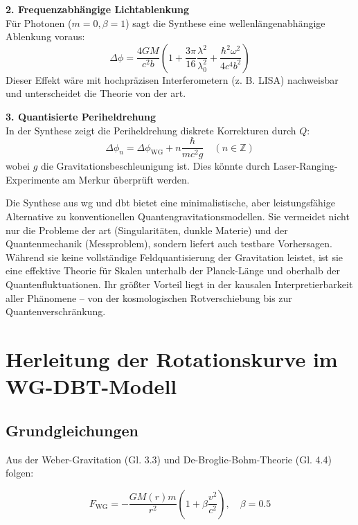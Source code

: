 \textbf{2. Frequenzabhängige Lichtablenkung}\\
Für Photonen ($m=0, \beta=1$) sagt die Synthese eine wellenlängenabhängige Ablenkung voraus:
\begin{equation}
    \Delta\phi = \frac{4GM}{c^2 b}\left(1 + \frac{3\pi}{16}\frac{\lambda^2}{\lambda_0^2} + \frac{\hbar^2 \omega^2}{4c^4 b^2}\right)
\end{equation}
Dieser Effekt wäre mit hochpräzisen Interferometern (z. B. LISA) nachweisbar und unterscheidet die Theorie von der \gls{art}.

\textbf{3. Quantisierte Periheldrehung}\\
In der Synthese zeigt die Periheldrehung diskrete Korrekturen durch $Q$:
\begin{equation}
    \Delta\phi_n = \Delta\phi_{\text{WG}} + n\frac{\hbar}{mc^2 g} \quad (n \in \mathbb{Z})    
\end{equation}
wobei $g$ die Gravitationsbeschleunigung ist. Dies könnte durch Laser-Ranging-Experimente am Merkur überprüft werden.

Die Synthese aus \gls{wg} und \gls{dbt} bietet eine minimalistische, aber leistungsfähige Alternative zu konventionellen Quantengravitationsmodellen. Sie vermeidet nicht nur
die Probleme der \gls{art} (Singularitäten, dunkle Materie) und der Quantenmechanik (Messproblem), sondern liefert auch testbare Vorhersagen. Während sie keine vollständige
Feldquantisierung der Gravitation leistet, ist sie eine effektive Theorie für Skalen unterhalb der Planck-Länge und oberhalb der Quantenfluktuationen. Ihr größter Vorteil
liegt in der kausalen Interpretierbarkeit aller Phänomene – von der kosmologischen Rotverschiebung bis zur Quantenverschränkung.

\section{Herleitung der Rotationskurve im WG-DBT-Modell}
\label{sec:rotationskurve_herleitung}

\subsection{Grundgleichungen}
Aus der Weber-Gravitation (Gl. 3.3) und De-Broglie-Bohm-Theorie (Gl. 4.4) folgen:

\begin{equation}
F_{\text{WG}} = -\frac{GM(r)m}{r^2}\left(1 + \beta\frac{v^2}{c^2}\right), \quad \beta = 0.5
\label{eq:wg_force}
\end{equation}

